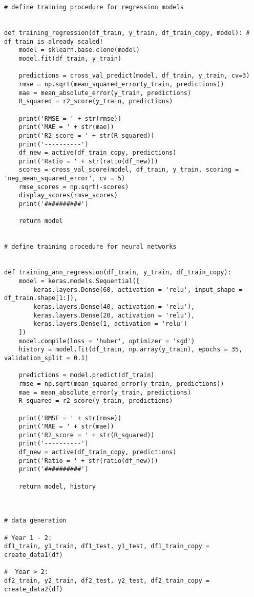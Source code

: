 \begin{lstlisting}
# define training procedure for regression models 


def training_regression(df_train, y_train, df_train_copy, model): # df_train is already scaled!
    model = sklearn.base.clone(model)
    model.fit(df_train, y_train)
    
    predictions = cross_val_predict(model, df_train, y_train, cv=3)
    rmse = np.sqrt(mean_squared_error(y_train, predictions))
    mae = mean_absolute_error(y_train, predictions)
    R_squared = r2_score(y_train, predictions)
    
    print('RMSE = ' + str(rmse))
    print('MAE = ' + str(mae))
    print('R2_score = ' + str(R_squared))
    print('----------')
    df_new = active(df_train_copy, predictions)
    print('Ratio = ' + str(ratio(df_new)))
    scores = cross_val_score(model, df_train, y_train, scoring = 'neg_mean_squared_error', cv = 5)
    rmse_scores = np.sqrt(-scores)
    display_scores(rmse_scores)
    print('##########')
    
    return model


# define training procedure for neural networks


def training_ann_regression(df_train, y_train, df_train_copy):
    model = keras.models.Sequential([
        keras.layers.Dense(60, activation = 'relu', input_shape = df_train.shape[1:]),
        keras.layers.Dense(40, activation = 'relu'),
        keras.layers.Dense(20, activation = 'relu'),
        keras.layers.Dense(1, activation = 'relu')
    ])
    model.compile(loss = 'huber', optimizer = 'sgd')
    history = model.fit(df_train, np.array(y_train), epochs = 35, validation_split = 0.1)
    
    predictions = model.predict(df_train)
    rmse = np.sqrt(mean_squared_error(y_train, predictions))
    mae = mean_absolute_error(y_train, predictions)
    R_squared = r2_score(y_train, predictions)
    
    print('RMSE = ' + str(rmse))
    print('MAE = ' + str(mae))
    print('R2_score = ' + str(R_squared))
    print('----------')
    df_new = active(df_train_copy, predictions)
    print('Ratio = ' + str(ratio(df_new)))
    print('##########')
    
    return model, history



# data generation

# Year 1 - 2:
df1_train, y1_train, df1_test, y1_test, df1_train_copy = create_data1(df)

#  Year > 2:
df2_train, y2_train, df2_test, y2_test, df2_train_copy = create_data2(df)




\end{lstlisting}

